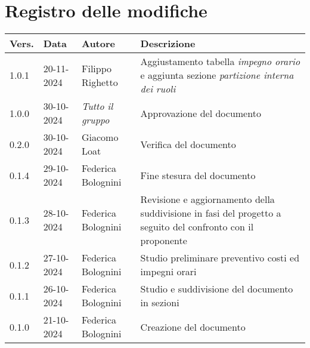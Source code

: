 \section*{Registro delle modifiche}

\begin{table}[h]
    \centering
    \begin{tabular}{|l|l|l|p{5cm}|}
        \hline
        \rowcolor[gray]{0.9}
        \textbf{Vers.} & \textbf{Data} & \textbf{Autore} & \textbf{Descrizione}\\
        \hline
        1.0.1 & 20-11-2024 & Filippo Righetto & Aggiustamento tabella \textit{impegno orario} e aggiunta sezione \textit{partizione interna dei ruoli}\\
        \hline
        1.0.0 & 30-10-2024 & \emph{Tutto il gruppo} & Approvazione del documento\\
        \hline
        0.2.0 & 30-10-2024 & Giacomo Loat & Verifica del documento\\
        \hline
        0.1.4 & 29-10-2024 & Federica Bolognini & Fine stesura del documento\\
        \hline
        0.1.3 & 28-10-2024 & Federica Bolognini & Revisione e aggiornamento della suddivisione in fasi del progetto a seguito del confronto con il proponente\\
        \hline
        0.1.2 & 27-10-2024 & Federica Bolognini & Studio preliminare preventivo costi ed impegni orari\\
        \hline
        0.1.1 & 26-10-2024 & Federica Bolognini & Studio e suddivisione del documento in sezioni\\
        \hline
        0.1.0 & 21-10-2024 & Federica Bolognini & Creazione del documento\\
        \hline
    \end{tabular}
\end{table}

